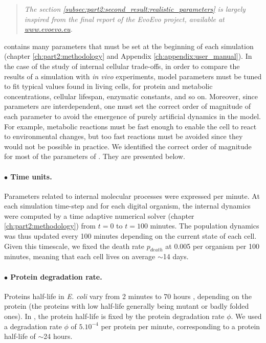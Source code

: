 \begin{quote}
\begin{center}
\textit{The section \ref{subsec:part2:second_result:realistic_parameters} is largely inspired from the final report of the EvoEvo project, available at \href{www.evoevo.eu}{www.evoevo.eu}.}
\end{center}
\end{quote}

{\EvoEvoSim} contains many parameters that must be set at the beginning of each simulation (chapter \ref{ch:part2:methodology} and Appendix \ref{ch:appendix:user_manual}). In the case of the study of internal cellular trade-offs, in order to compare the results of a simulation with \textit{in vivo} experiments, model parameters must be tuned to fit typical values found in living cells, for protein and metabolic concentrations, cellular lifespan, enzymatic constants, and so on. Moreover, since parameters are interdependent, one must set the correct order of magnitude of each parameter to avoid the emergence of purely artificial dynamics in the model. For example, metabolic reactions must be fast enough to enable the cell to react to environmental changes, but too fast reactions must be avoided since they would not be possible in practice. We identified the correct order of magnitude for most of the parameters of {\EvoEvoSim}. They are presented below.

\paragraph{$\bullet$ Time units.}
Parameters related to internal molecular processes were expressed per minute. At each simulation time-step and for each digital organism, the internal dynamics were computed by a time adaptive numerical solver (chapter \ref{ch:part2:methodology}) from $t=0$ to $t=100$ minutes. The population dynamics was thus updated every 100 minutes depending on the current state of each cell. Given this timescale, we fixed the death rate $p_{death}$ at 0.005 per organism per 100 minutes, meaning that each cell lives on average $\sim$14 days.

\paragraph{$\bullet$ Protein degradation rate.}
Proteins half-life in \textit{E. coli} vary from 2 minutes to 70 hours \citep{maurizi-1992}, depending on the protein (the proteins with low half-life generally being mutant or badly folded ones). In {\EvoEvoSim}, the protein half-life is fixed by the protein degradation rate $\phi$. We used a degradation rate $\phi$ of $5.10^{-4}$ per protein per minute, corresponding to a protein half-life of $\sim$24 hours.

